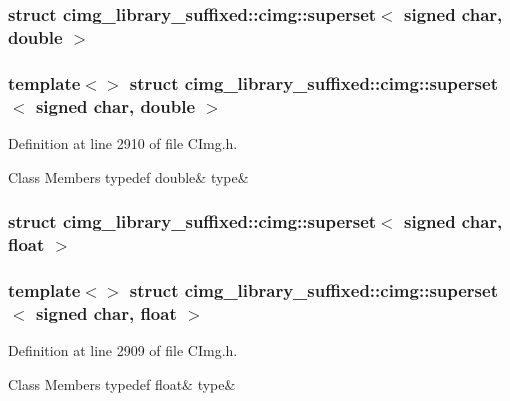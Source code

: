 \subsubsection{struct cimg\+\_\+library\+\_\+suffixed\+:\+:cimg\+:\+:superset$<$ signed char, double $>$}
\subsubsection*{template$<$$>$\newline
struct cimg\+\_\+library\+\_\+suffixed\+::cimg\+::superset$<$ signed char, double $>$}



Definition at line 2910 of file C\+Img.\+h.

\begin{DoxyFields}{Class Members}
\mbox{\label{namespacecimg__library__suffixed_1_1cimg_a72c08549867610f27cedf98e3c795a25}} 
typedef double&
type&
\\
\hline

\end{DoxyFields}
\label{structcimg__library__suffixed_1_1cimg_1_1superset_3_01signed_01char_00_01float_01_4}
\subsubsection{struct cimg\+\_\+library\+\_\+suffixed\+:\+:cimg\+:\+:superset$<$ signed char, float $>$}
\subsubsection*{template$<$$>$\newline
struct cimg\+\_\+library\+\_\+suffixed\+::cimg\+::superset$<$ signed char, float $>$}



Definition at line 2909 of file C\+Img.\+h.

\begin{DoxyFields}{Class Members}
\mbox{\label{namespacecimg__library__suffixed_1_1cimg_afe8c13a5ba8277de526e34876588fcca}} 
typedef float&
type&
\\
\hline

\end{DoxyFields}
\label{structcimg__library__suffixed_1_1cimg_1_1superset_3_01signed_01char_00_01int_01_4}
